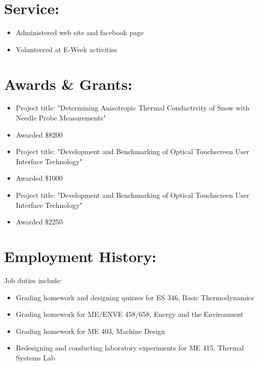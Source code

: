 \documentclass{resume}
\begin{document}
\section{Service:}
    \small
    \begin{itemize}
        \item Administered web site and facebook page
        \item Volunteered at E-Week activities
    \end{itemize}
    \normalsize
        
\section{Awards \& Grants:}
    \small
    \begin{itemize}
        \item Project title: "Determining Anisotropic Thermal Conductivity of Snow with Needle Probe Measurements"
        \item Awarded \$8200
    \end{itemize}
    \normalsize

    \small
    \begin{itemize}
        \item Project title: "Development and Benchmarking of Optical Touchscreen User Interface Technology"
        \item Awarded \$1000
    \end{itemize}
    \normalsize

    \small
    \begin{itemize}
        \item Project title: "Development and Benchmarking of Optical Touchscreen User Interface Technology"
        \item Awarded \$2250
    \end{itemize}
    \normalsize
        
\section{Employment History:}
    \normalsize
    Job duties include:
    \small
    \begin{itemize}
        \item Grading homework and designing quizzes for ES 346, Basic Thermodynamics
        \item Grading homework for ME/ENVE 458/658, Energy and the Environment
        \item Grading homework for ME 403, Machine Design
        \item Redesigning and conducting laboratory experiments for ME 415, Thermal Systems Lab
    \end{itemize}
    \normalsize
    \medskip
\end{document}
